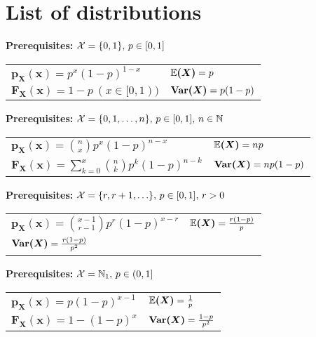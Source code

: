 \section{List of distributions}

\renewcommand{\arraystretch}{1.8}
\begin{ddefinition*}
  \textbf{Prerequisites:} \(\operatorname{\mathcal{X}} = \{0, 1\}, \, p \in [0, 1]\) \\
  \begin{tabularx}{\linewidth}{@{}ll@{}}
    \(\bm{p_X(x)} = p^x(1 - p)^{1 - x}\) & \(\bm{\mathbb{E}(X)} = p\) \\
    \(\bm{F_X(x)} = 1 - p \ (x \in [0, 1))\) & \(\bm{\Var(X)} = p(1 - p)\)
  \end{tabularx}
\end{ddefinition*}

\begin{ddefinition*}
  \textbf{Prerequisites:} \(\operatorname{\mathcal{X}} = \{0, 1, \ldots, n\}, \, p \in [0, 1], \, n \in \mathbb{N}\) \\
  \begin{tabularx}{\linewidth}{@{}ll@{}}
    \(\bm{p_X(x)} = \binom{n}{x}p^x(1 - p)^{n - x}\) & \(\bm{\mathbb{E}(X)} = np\) \\
    \(\bm{F_X(x)} = \sum\limits_{k = 0}^x \binom{n}{k}p^k (1-p)^{n-k}\) & \(\bm{\Var(X)} = np(1 - p)\)
  \end{tabularx}
\end{ddefinition*}

\begin{ddefinition*}
  \textbf{Prerequisites:} \(\operatorname{\mathcal{X}} = \{r, r+1, \ldots\}, \, p \in [0, 1], \, r > 0\) \\
  \begin{tabularx}{\linewidth}{@{}ll@{}}
    \(\bm{p_X(x)} = \binom{x - 1}{r - 1}p^r(1 - p)^{x - r}\) & \(\bm{\mathbb{E}(X)} = \frac{r(1 - p)}{p}\) \\
    \(\bm{\Var(X)} = \frac{r(1 - p)}{p^2}\)
  \end{tabularx}
\end{ddefinition*}

\begin{ddefinition*}
  \textbf{Prerequisites:} \(\operatorname{\mathcal{X}} = \mathbb{N}_1, \, p \in (0, 1]\) \\
  \begin{tabularx}{\linewidth}{@{}ll@{}}
    \(\bm{p_X(x)} = p(1-p)^{x-1}\) & \(\bm{\mathbb{E}(X)} = \frac{1}{p}\) \\
    \(\bm{F_X(x)} = 1 - (1 - p)^x\) & \(\bm{\Var(X)} = \frac{1 - p}{p^2}\)
  \end{tabularx}
\end{ddefinition*}

